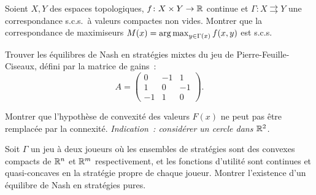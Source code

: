 \begin{exercice}
Soient $X, Y$ des espaces topologiques, $f\colon X \times Y \to \mathbb{R}$ continue et
$\Gamma\colon X \rightrightarrows Y$ une correspondance s.c.s.\ \`a valeurs compactes non
vides. Montrer que la correspondance de maximiseurs
$M(x) = \operatorname*{arg\,max}_{y \in \Gamma(x)} f(x,y)$ est s.c.s.
\end{exercice}

\begin{exercice}
Trouver les \'equilibres de Nash en strat\'egies mixtes du jeu de Pierre-Feuille-Ciseaux,
d\'efini par la matrice de gains~:
\[
  A = \begin{pmatrix} 0 & -1 & 1 \\ 1 & 0 & -1 \\ -1 & 1 & 0 \end{pmatrix}.
\]
\end{exercice}

\begin{exercice}
Montrer que l'hypoth\`ese de convexit\'e des valeurs $F(x)$ ne peut pas \^etre remplac\'ee
par la connexit\'e. \emph{Indication~: consid\'erer un cercle dans $\mathbb{R}^2$.}
\end{exercice}

\begin{exercice}
Soit $\Gamma$ un jeu \`a deux joueurs o\`u les ensembles de strat\'egies sont des convexes
compacts de $\mathbb{R}^n$ et $\mathbb{R}^m$ respectivement, et les fonctions d'utilit\'e sont continues
et quasi-concaves en la strat\'egie propre de chaque joueur. Montrer l'existence d'un
\'equilibre de Nash en strat\'egies pures.
\end{exercice}
